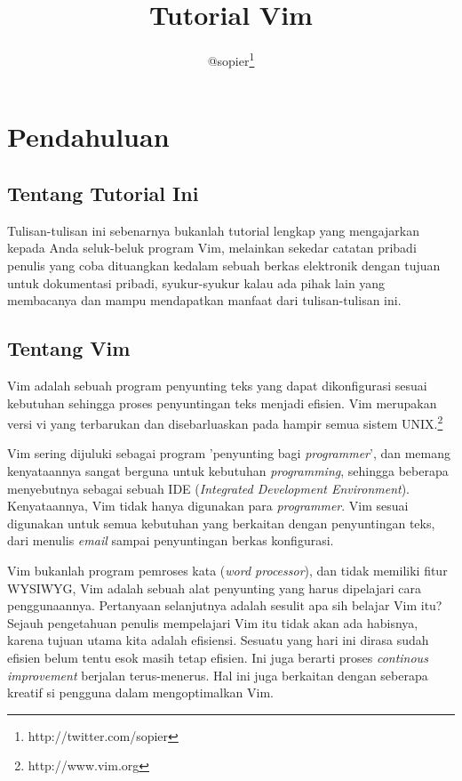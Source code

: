\documentclass{article}
\author{@sopier\footnote{http://twitter.com/sopier}}
\title{Tutorial Vim}
\date{}
\begin{document}
\maketitle
\tableofcontents
\pagebreak

\section{Pendahuluan}
\subsection{Tentang Tutorial Ini}
Tulisan-tulisan ini sebenarnya bukanlah tutorial lengkap
yang mengajarkan kepada Anda seluk-beluk program Vim,
melainkan sekedar catatan pribadi penulis yang coba
dituangkan kedalam sebuah berkas elektronik dengan tujuan
untuk dokumentasi pribadi, syukur-syukur kalau ada pihak
lain yang membacanya dan mampu mendapatkan manfaat dari
tulisan-tulisan ini.

\subsection{Tentang Vim}
Vim adalah sebuah program penyunting teks yang dapat
dikonfigurasi sesuai kebutuhan sehingga proses penyuntingan
teks menjadi efisien. Vim merupakan versi vi yang
terbarukan dan disebarluaskan pada hampir semua sistem
UNIX.\footnote{http://www.vim.org}

Vim sering dijuluki sebagai program 'penyunting bagi
\emph{programmer}', dan memang kenyataannya sangat berguna
untuk kebutuhan \emph{programming}, sehingga beberapa
menyebutnya sebagai sebuah IDE (\emph{Integrated Development
Environment}). Kenyataannya, Vim tidak hanya digunakan para
\emph{programmer}. Vim sesuai digunakan untuk semua
kebutuhan yang berkaitan dengan penyuntingan teks, dari
menulis \emph{email} sampai penyuntingan berkas konfigurasi.

Vim bukanlah program pemroses kata (\emph{word processor}),
dan tidak memiliki fitur WYSIWYG, Vim adalah sebuah alat
penyunting yang harus dipelajari cara penggunaannya.
Pertanyaan selanjutnya adalah sesulit apa sih belajar Vim
itu? Sejauh pengetahuan penulis mempelajari Vim itu tidak
akan ada habisnya, karena tujuan utama kita adalah efisiensi.
Sesuatu yang hari ini dirasa sudah efisien belum tentu esok
masih tetap efisien. Ini juga berarti proses \emph{continous
improvement} berjalan terus-menerus. Hal ini juga berkaitan
dengan seberapa kreatif si pengguna dalam mengoptimalkan
Vim.
\end{document}
